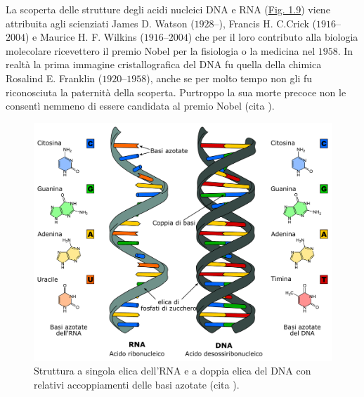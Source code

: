 \documentclass[12pt,a4paper,twoside]{report}
\begin{document}
	La scoperta delle strutture degli acidi nucleici DNA e RNA (\hyperref[fig:dna_structure]{Fig. 1.9}) viene attribuita agli scienziati James D. Watson ($1928$--), Francis H. C.Crick ($1916$--$2004$) e Maurice H. F. Wilkins ($1916$--$2004$) che per il loro contributo alla biologia molecolare ricevettero il premio Nobel per la fisiologia o la medicina nel $1958$. In realtà la prima immagine cristallografica del DNA fu quella della chimica Rosalind E. Franklin ($1920$--$1958$), anche se per molto tempo non gli fu riconosciuta la paternità della scoperta. Purtroppo la sua morte precoce non le consentì nemmeno di essere candidata al premio Nobel (cita
	).
	
	\begin{figure}[H]
		\centering
		\includegraphics[width=0.9\linewidth]{images/dna_structure.pdf}
		\caption{Struttura a singola elica dell'RNA e a doppia elica del DNA con relativi accoppiamenti delle basi azotate (cita
		).}
		\label{fig:dna_structure}
	\end{figure}
	
\end{document}

